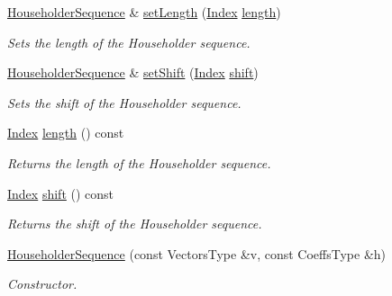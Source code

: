 \begin{DoxyCompactItemize}
\hyperlink{group___householder___module_class_eigen_1_1_householder_sequence}{Householder\+Sequence} \& \hyperlink{group___householder___module_a30cc06d5b2ca4b7dcf5fcd53313d25fc}{set\+Length} (\hyperlink{group___core___module_a554f30542cc2316add4b1ea0a492ff02}{Index} \hyperlink{group___householder___module_ac62fad812f3893f237378fe70e55bf66}{length})
\begin{DoxyCompactList}\small\item\em Sets the length of the Householder sequence. \end{DoxyCompactList}\item 
\hyperlink{group___householder___module_class_eigen_1_1_householder_sequence}{Householder\+Sequence} \& \hyperlink{group___householder___module_a2d8d996ce1085fd977850988735739f0}{set\+Shift} (\hyperlink{group___core___module_a554f30542cc2316add4b1ea0a492ff02}{Index} \hyperlink{group___householder___module_a34482bfad5563fd8a8a4264db76ac917}{shift})
\begin{DoxyCompactList}\small\item\em Sets the shift of the Householder sequence. \end{DoxyCompactList}\item 
\mbox{\label{group___householder___module_ac62fad812f3893f237378fe70e55bf66}} 
\hyperlink{group___core___module_a554f30542cc2316add4b1ea0a492ff02}{Index} \hyperlink{group___householder___module_ac62fad812f3893f237378fe70e55bf66}{length} () const
\begin{DoxyCompactList}\small\item\em Returns the length of the Householder sequence. \end{DoxyCompactList}\item 
\mbox{\label{group___householder___module_a34482bfad5563fd8a8a4264db76ac917}} 
\hyperlink{group___core___module_a554f30542cc2316add4b1ea0a492ff02}{Index} \hyperlink{group___householder___module_a34482bfad5563fd8a8a4264db76ac917}{shift} () const
\begin{DoxyCompactList}\small\item\em Returns the shift of the Householder sequence. \end{DoxyCompactList}\item 
\hyperlink{group___householder___module_af6aeede87ed8dac452f4fa8b4f45c3f2}{Householder\+Sequence} (const Vectors\+Type \&v, const Coeffs\+Type \&h)
\begin{DoxyCompactList}\small\item\em Constructor. \end{DoxyCompactList}\item 

\end{DoxyCompactItemize}

